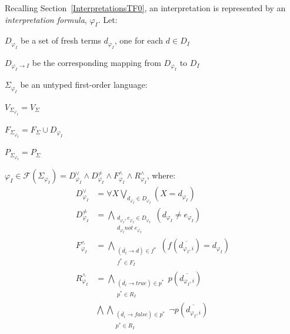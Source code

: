 \documentclass[letterpaper]{article}
\newenvironment{packed_itemize}{
\vspace*{-0.2em}
\begin{itemize}
\setlength{\partopsep}{0pt}
\setlength{\itemsep}{1pt}
\setlength{\parskip}{0pt}
\setlength{\parsep}{0pt}
}{\end{itemize}}
\newcommand{\true}{{\mathit{true}}}
\newcommand{\false}{{\mathit{false}}}
\begin{document}
\noindent
Recalling Section~\ref{InterpretationsTF0}, an interpretation is represented by an 
{\em interpretation formula}, $\varphi_I$.
Let:
\begin{packed_itemize}
\item $D_{\varphi_I}$ be a set of fresh terms $d_{\varphi_I}$, one for each $d \in D_I$
\item $D_{\varphi_I \rightarrow I}$ be the corresponding mapping from $D_{\varphi_I}$ to $D_I$
\item $\Sigma_{\varphi_I}$ be an untyped first-order language:
      \begin{packed_itemize}
      \item $V_{\Sigma_{\varphi_I}} = V_\Sigma$
      \item $F_{\Sigma_{\varphi_I}} = F_\Sigma \cup D_{\varphi_I}$
      \item $P_{\Sigma_{\varphi_I}} = P_\Sigma$
      \end{packed_itemize}
\item $\varphi_I \in \mathcal{F}(\Sigma_{\varphi_I}) = 
D^\vee_{\varphi_I} \land D^{\neq}_{\varphi_I} \land F^\wedge_{\varphi_I} \land 
R^\wedge_{\varphi_I}$, where:
\begin{equation*}
\begin{split}
D^\vee_{\varphi_I}   &= \forall X \bigvee_{d_{\varphi_I} \in D_{\varphi_I}} \left(X = d_{\varphi_I} \right) \\
D^{\neq}_{\varphi_I} &= \bigwedge_{\substack{d_{\varphi_I},e_{\varphi_I} \in D_{\varphi_I} \\
                                             d_{\varphi_I} not\;e_{\varphi_I}}} \left(d_{\varphi_I} \neq e_{\varphi_I} \right) \\
F^\wedge_{\varphi_I} &= \bigwedge_{\substack{(\overline{d_i} \rightarrow d) \in f^* \\ 
                                             f^* \in F_I}} ( f(\overline{d_{\varphi_I,i}}) = d_{\varphi_I} ) \\
R^\wedge_{\varphi_I} &= \bigwedge_{\substack{(\overline{d_i} \rightarrow \true) \in p^* \\
                                             p^* \in R_I}} p(\overline{d_{\varphi_I,i}}) \\
                     &\bigwedge \bigwedge_{\substack{(\overline{d_i} \rightarrow \false) \in p^* \\
                                             p^* \in R_I}} \neg p(\overline{d_{\varphi_I,i}})
\end{split}
\end{equation*}
\end{packed_itemize}
\end{document}
